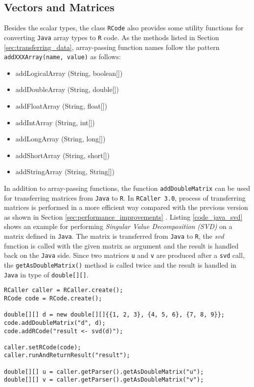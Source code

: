 \documentclass[10pt,a4paper, final, oneside]{article}
\begin{document}
\subsection{Vectors and Matrices}
\label{sec:vectors_and_matrices}

Besides the scalar types, the class \texttt{RCode} also provides some utility functions for converting \texttt{Java} array types to \texttt{R} code. As the methods listed in Section \ref{sec:transferring_data}, array-passing function names follow the pattern \texttt{addXXXArray(name, value)} as follows:

\begin{itemize}
\item addLogicalArray (String, boolean[])
\item addDoubleArray (String, double[])
\item addFloatArray (String, float[])
\item addIntArray (String, int[])
\item addLongArray (String, long[])
\item addShortArray (String, short[])
\item addStringArray (String, String[])
\end{itemize}

In addition to array-passing functions, the function \texttt{addDoubleMatrix} can be used for transferring matrices from \texttt{Java} to \texttt{R}. In \texttt{RCaller 3.0}, process of transferring matrices is performed in a more efficient way compared with the previous version as shown in Section \ref{sec:performance_improvements} \cite{satman2014rcaller}. Listing \ref{code_java_svd} shows an example for performing \emph{Singular Value Decomposition} \emph{(SVD)} on a matrix defined in \texttt{Java}. The matrix is transferred from \texttt{Java} to \texttt{R}, the \emph{svd} function is called with the given matrix as argument and the result is handled back on the \texttt{Java} side. Since two matrices \texttt{u} and \texttt{v} are produced after a \texttt{svd} call, the \texttt{getAsDoubleMatrix()} method is called twice and the result is handled in \texttt{Java} in type of \texttt{double[][]}.


\begin{minipage}{\linewidth}
\begin{lstlisting}[caption=Transferring Matrices,label=code_java_svd]
RCaller caller = RCaller.create();
RCode code = RCode.create();

double[][] d = new double[][]{{1, 2, 3}, {4, 5, 6}, {7, 8, 9}};
code.addDoubleMatrix("d", d);
code.addRCode("result <- svd(d)");

caller.setRCode(code);
caller.runAndReturnResult("result");

double[][] u = caller.getParser().getAsDoubleMatrix("u");
double[][] v = caller.getParser().getAsDoubleMatrix("v");
\end{lstlisting}
\end{minipage}
\end{document}
